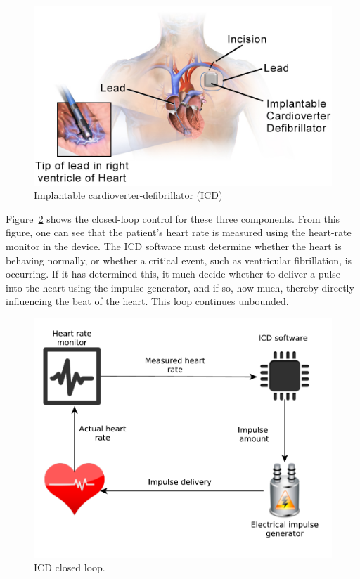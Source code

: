 \documentclass[11pt]{article}
\begin{document}
\begin{figure}[!h]
 \centering
 \includegraphics[scale=0.27]{./figs/ICD_InsideLeads}
 \caption{Implantable cardioverter-defibrillator (ICD)}
 \label{fig:icd}
\end{figure}

Figure~\ref{fig:icd-loop} shows the closed-loop control for these three components. From this figure, one can see that the patient's heart rate is measured using the heart-rate monitor in the device. The ICD software must determine whether the heart  is behaving normally, or whether a critical event, such as ventricular fibrillation, is occurring. If it has determined this, it much decide whether to deliver a pulse into the heart using the impulse generator, and if so, how much, thereby directly influencing the beat of the heart. This loop continues unbounded.

\begin{figure}[!h]
 \centering
 \includegraphics[scale=0.6]{./figs/icd-loop}
 \caption{ICD closed loop.}
 \label{fig:icd-loop}
\end{figure}
\end{document}
